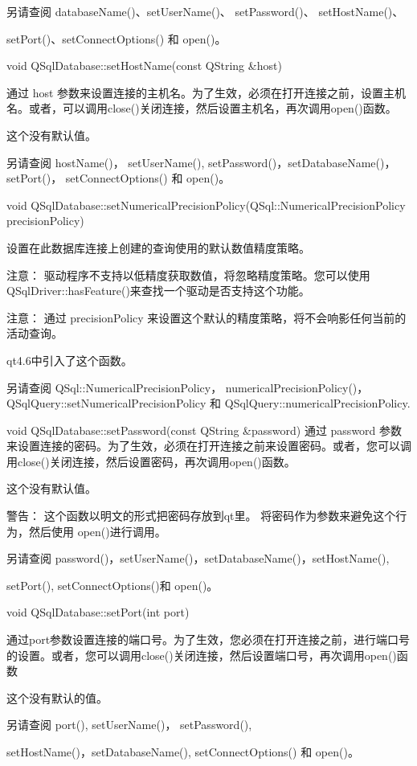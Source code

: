 另请查阅 databaseName()、setUserName()、 setPassword()、 setHostName()、 

setPort()、setConnectOptions() 和 open()。


void QSqlDatabase::setHostName(const QString \&host)

通过 host 参数来设置连接的主机名。为了生效，必须在打开连接之前，设置主机名。或者，可以调用close()关闭连接，然后设置主机名，再次调用open()函数。

这个没有默认值。

另请查阅 hostName()， setUserName(), setPassword()，setDatabaseName()，setPort()， setConnectOptions() 和 open()。

void QSqlDatabase::setNumericalPrecisionPolicy(QSql::NumericalPrecisionPolicy precisionPolicy)


设置在此数据库连接上创建的查询使用的默认数值精度策略。

注意： 驱动程序不支持以低精度获取数值，将忽略精度策略。您可以使用 QSqlDriver::hasFeature()来查找一个驱动是否支持这个功能。

注意： 通过 precisionPolicy 来设置这个默认的精度策略，将不会响影任何当前的活动查询。

qt4.6中引入了这个函数。

另请查阅 QSql::NumericalPrecisionPolicy，
numericalPrecisionPolicy()，QSqlQuery::setNumericalPrecisionPolicy 和 QSqlQuery::numericalPrecisionPolicy.

void QSqlDatabase::setPassword(const QString \&password)
通过 password 参数来设置连接的密码。为了生效，必须在打开连接之前来设置密码。或者，您可以调用close()关闭连接，然后设置密码，再次调用open()函数。

这个没有默认值。

警告： 这个函数以明文的形式把密码存放到qt里。 将密码作为参数来避免这个行为，然后使用 open()进行调用。

另请查阅 password()，setUserName()，setDatabaseName()，setHostName(),

setPort(), setConnectOptions()和 open()。

void QSqlDatabase::setPort(int port)

通过port参数设置连接的端口号。为了生效，您必须在打开连接之前，进行端口号的设置。或者，您可以调用close()关闭连接，然后设置端口号，再次调用open()函数

这个没有默认的值。

另请查阅 port(), setUserName()， setPassword(),

setHostName()，setDatabaseName(), setConnectOptions() 和 open()。

